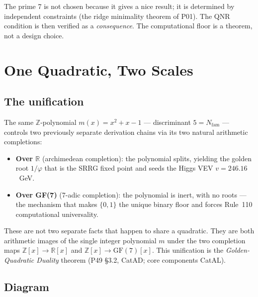 \documentclass[11pt,a4paper]{article}
\newcommand{\Nfam}{N_{\mathrm{fam}}}
\begin{document}
\medskip
The prime 7 is not chosen because it gives a nice result; it is determined
by independent constraints (the ridge minimality theorem of P01).  The QNR
condition is then verified as a \emph{consequence}.  The computational floor
is a theorem, not a design choice.

\section{One Quadratic, Two Scales}
\label{sec:unification}

\subsection{The unification}

The same $\mathbb{Z}$-polynomial $m(x) = x^2 + x - 1$ — discriminant $5 = \Nfam$ —
controls two previously separate derivation chains via its two natural arithmetic
completions:

\begin{itemize}
  \item \textbf{Over $\mathbb{R}$} (archimedean completion): the polynomial splits,
    yielding the golden root $1/\varphi$ that is the SRRG fixed point and seeds
    the Higgs VEV $v = 246.16$~GeV.
  \item \textbf{Over GF(7)} (7-adic completion): the polynomial is inert,
    with no roots — the mechanism that makes $\{0,1\}$ the unique binary floor
    and forces Rule~110 computational universality.
\end{itemize}

These are not two separate facts that happen to share a quadratic.  They are
both arithmetic images of the single integer polynomial $m$ under the
two completion maps $\mathbb{Z}[x] \to \mathbb{R}[x]$ and
$\mathbb{Z}[x] \to \mathrm{GF}(7)[x]$.  This unification is the
\emph{Golden-Quadratic Duality} theorem (P49 §3.2, CatAD; core components CatAL).

\subsection{Diagram}
\end{document}
